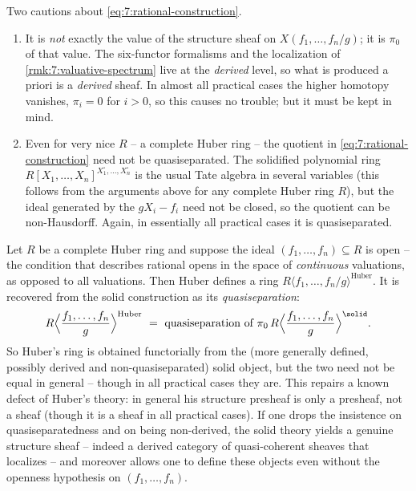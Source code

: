\begin{remark}
\label{rmk:7:warnings}
Two cautions about \eqref{eq:7:rational-construction}.
\begin{enumerate}
\item It is \emph{not} exactly the value of the structure sheaf on
$X(f_1,\dots,f_n/g)$; it is $\pi_0$ of that value. The six-functor formalisms
and the localization of \cref{rmk:7:valuative-spectrum} live at the
\emph{derived} level, so what is produced a priori is a \emph{derived} sheaf.
In almost all practical cases the higher homotopy vanishes, $\pi_i=0$ for
$i>0$, so this causes no trouble; but it must be kept in mind.
\item Even for very nice $R$ -- a complete Huber ring -- the quotient in
\eqref{eq:7:rational-construction} need not be quasiseparated. The solidified
polynomial ring
$R[X_1,\dots,X_n]^{X_1^{\square},\dots,X_n^{\square}}$ is the usual
Tate algebra in several variables (this follows from the arguments above for
any complete Huber ring $R$), but the ideal generated by the $gX_i-f_i$ need
not be closed, so the quotient can be non-Hausdorff. Again, in essentially all
practical cases it is quasiseparated.
\end{enumerate}
\end{remark}

\begin{remark}
\label{rmk:7:huber}
Let $R$ be a complete Huber ring and suppose the ideal $(f_1,\dots,f_n)\subseteq
R$ is open -- the condition that describes rational opens in the space of
\emph{continuous} valuations, as opposed to all valuations. Then Huber
\cite{Huber_1994} defines a ring $R\langle f_1,\dots,f_n/g\rangle^{\mathrm{Huber}}$.
It is recovered from the solid construction as its \emph{quasiseparation}:
\begin{equation*}
R\Bigl\langle\frac{f_1,\dots,f_n}{g}\Bigr\rangle^{\mathrm{Huber}}\ =\
\text{quasiseparation of}\ \pi_0\, R\Bigl\langle\frac{f_1,\dots,f_n}{g}
\Bigr\rangle^{\solid}.
\end{equation*}
So Huber's ring is obtained functorially from the (more generally defined,
possibly derived and non-quasiseparated) solid object, but the two need not be
equal in general -- though in all practical cases they are. This repairs a
known defect of Huber's theory: in general his structure presheaf is only a
presheaf, not a sheaf (though it is a sheaf in all practical cases). If one
drops the insistence on quasiseparatedness and on being non-derived, the solid
theory yields a genuine structure sheaf -- indeed a derived category of
quasi-coherent sheaves that localizes -- and moreover allows one to define
these objects even without the openness hypothesis on $(f_1,\dots,f_n)$.
\end{remark}

